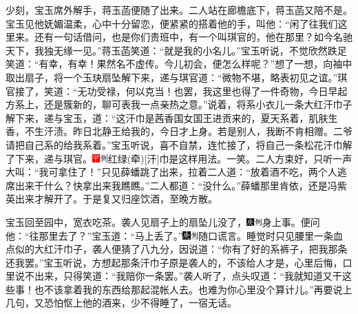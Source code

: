 少刻，宝玉席外解手，蒋玉菡便随了出来。二人站在廊檐底下，蒋玉菡又陪不是。宝玉见他妩媚温柔，心中十分留恋，便紧紧的搭着他的手，叫他：``闲了往我们这里来。还有一句话借问，也是你们贵班中，有一个叫琪官的，他在那里？如今名驰天下，我独无缘一见。''蒋玉菡笑道：``就是我的小名儿。''宝玉听说，不觉欣然跌足笑道：``有幸，有幸！果然名不虚传。今儿初会，便怎么样呢？''想了一想，向袖中取出扇子，将一个玉玦扇坠解下来，递与琪官道：``微物不堪，略表初见之谊。''琪官接了，笑道：``无功受禄，何以克当！也罢，我这里也得了一件奇物，今日早起方系上，还是簇新的，聊可表我一点亲热之意。''说着，将系小衣儿一条大红汗巾子解下来，递与宝玉，道：``这汗巾是茜香国女国王进贡来的，夏天系着，肌肤生香，不生汗渍。昨日北静王给我的，今日才上身。若是别人，我断不肯相赠。二爷请把自己系的给我系着。''宝玉听说，喜不自禁，连忙接了，将自己一条松花汗巾解了下来，递与琪官。{\includegraphics[width=3mm]{../Images/00002}\includegraphics[width=3mm]{../Images/00011}\footnotesize \kaishu 红绿{(牵)}{[}汗{]}巾是这样用法。一笑。}二人方束好，只听一声大叫：``我可拿住了！''只见薛蟠跳了出来，拉着二人道：``放着酒不吃，两个人逃席出来干什么？快拿出来我瞧瞧。''二人都道：``没什么。''薛蟠那里肯依，还是冯紫英出来才解开了。于是复又归座饮酒，至晚方散。

宝玉回至园中，宽衣吃茶。袭人见扇子上的扇坠儿没了，{\includegraphics[width=3mm]{../Images/00004}\includegraphics[width=3mm]{../Images/00011}\footnotesize \kaishu 身上事。}便问他：``往那里去了？''宝玉道：``马上丢了。''{\includegraphics[width=3mm]{../Images/00004}\includegraphics[width=3mm]{../Images/00011}\footnotesize \kaishu 随口谎言。}睡觉时只见腰里一条血点似的大红汗巾子，袭人便猜了八九分，因说道：``你有了好的系裤子，把我那条还我罢。''宝玉听说，方想起那条汗巾子原是袭人的，不该给人才是，心里后悔，口里说不出来，只得笑道：``我赔你一条罢。''袭人听了，点头叹道：``我就知道又干这些事！也不该拿着我的东西给那起混帐人去。也难为你心里没个算计儿。''再要说上几句，又恐怕怄上他的酒来，少不得睡了，一宿无话。


